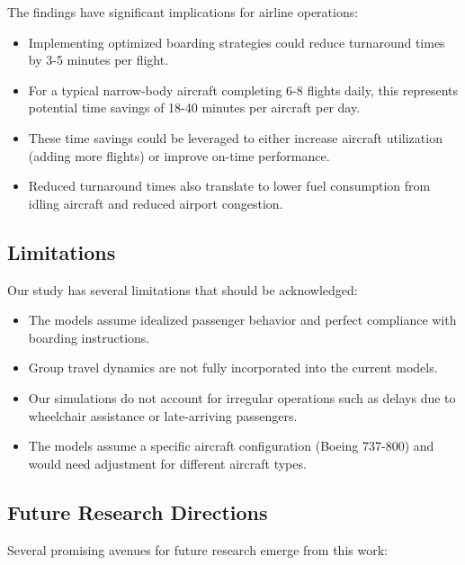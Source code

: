 \documentclass[12pt]{article}
\begin{document}
The findings have significant implications for airline operations:

\begin{itemize}
    \item Implementing optimized boarding strategies could reduce turnaround times by 3-5 minutes per flight.
    
    \item For a typical narrow-body aircraft completing 6-8 flights daily, this represents potential time savings of 18-40 minutes per aircraft per day.
    
    \item These time savings could be leveraged to either increase aircraft utilization (adding more flights) or improve on-time performance.
    
    \item Reduced turnaround times also translate to lower fuel consumption from idling aircraft and reduced airport congestion.
\end{itemize}

\subsection{Limitations}

Our study has several limitations that should be acknowledged:

\begin{itemize}
    \item The models assume idealized passenger behavior and perfect compliance with boarding instructions.
    
    \item Group travel dynamics are not fully incorporated into the current models.
    
    \item Our simulations do not account for irregular operations such as delays due to wheelchair assistance or late-arriving passengers.
    
    \item The models assume a specific aircraft configuration (Boeing 737-800) and would need adjustment for different aircraft types.
\end{itemize}

\subsection{Future Research Directions}

Several promising avenues for future research emerge from this work:
\end{document}
